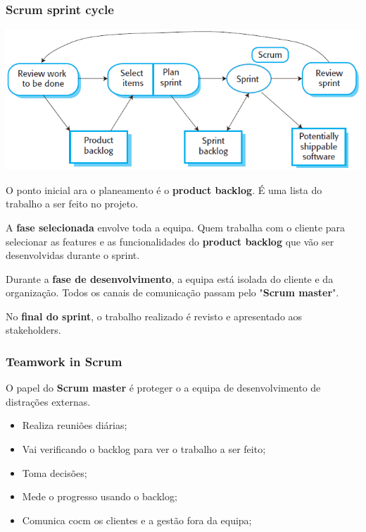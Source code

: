\documentclass{article}
\begin{document}
\subsubsection{Scrum sprint cycle}

\begin{center}
  \includegraphics[scale=0.5]{29}
\end{center}

O ponto inicial ara o planeamento é o \textbf{product backlog}.
É uma lista do trabalho a ser feito no projeto.

\vspace{2mm}

A \textbf{fase selecionada} envolve toda a equipa. Quem trabalha com o
cliente para selecionar as features e as funcionalidades do
\textbf{product backlog} que vão ser desenvolvidas durante o sprint.

\vspace{2mm}

Durante a \textbf{fase de desenvolvimento}, a equipa está isolada do
cliente e da organização. Todos os canais de comunicação passam pelo
"\textbf{Scrum master}".

\vspace{2mm}

No \textbf{final do sprint}, o trabalho realizado é revisto e apresentado aos
stakeholders.

\subsubsection{Teamwork in Scrum}

O papel do \textbf{Scrum master} é proteger o a equipa de desenvolvimento
de distrações externas.
\begin{itemize}
  \item Realiza reuniões diárias;
  \item Vai verificando o backlog para ver o trabalho a ser feito;
  \item Toma decisões;
  \item Mede o progresso usando o backlog;
  \item Comunica cocm os clientes e a gestão fora da equipa;
\end{itemize}
\end{document}
